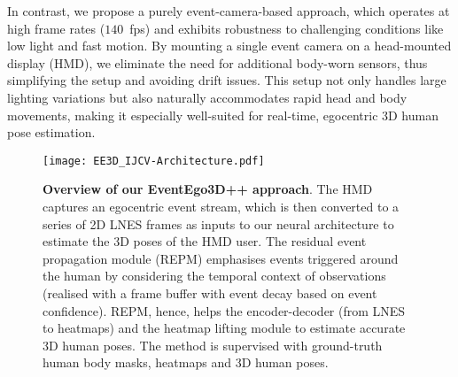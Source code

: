 In contrast, we propose a purely event-camera-based approach, which operates at high frame rates (\ie $140$~fps) and exhibits robustness to challenging conditions like low light and fast motion. 
%
By mounting a single event camera on a head-mounted display (HMD), we eliminate the need for additional body-worn sensors, thus simplifying the setup and avoiding drift issues. 
%
This setup not only handles large lighting variations but also naturally accommodates rapid head and body movements, making it especially well-suited for real-time, egocentric 3D human pose estimation.




\begin{figure*}[t]
\begin{center}
   \texttt{[image: EE3D\_IJCV-Architecture.pdf]}
\end{center}
    \caption{
    \textbf{Overview of our EventEgo3D++ approach}. 
    The HMD captures an egocentric event stream, which is then converted to a series of 2D LNES frames \citep{rudnev2021eventhands} as inputs to our neural architecture to estimate the 3D poses of the HMD user.
    The residual event propagation module (REPM) emphasises events triggered around the human by considering the temporal context of observations (realised with a frame buffer with event decay based on event confidence). 
    REPM, hence, helps the encoder-decoder (from LNES to heatmaps) and the heatmap lifting module to estimate accurate 3D human poses. 
    The method is supervised with ground-truth human body masks, heatmaps and 3D human poses.
}
\label{fig:eventego}
\end{figure*}